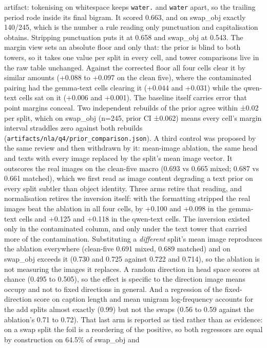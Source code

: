 \documentclass[
  11pt,
]{article}
\begin{document}
artifact: tokenising on whitespace keeps \texttt{water.} and
\texttt{water} apart, so the trailing period rode inside its final
bigram. It scored 0.663, and on swap\_obj exactly 140/245, which is the
number a rule reading only punctuation and capitalisation obtains.
Stripping punctuation puts it at 0.658 and swap\_obj at 0.543. The
margin view sets an absolute floor and only that: the prior is blind to
both towers, so it takes one value per split in every cell, and tower
comparisons live in the raw table unchanged. Against the corrected floor
all four cells clear it by similar amounts (+0.088 to +0.097 on the
clean five), where the contaminated pairing had the gemma-text cells
clearing it (+0.044 and +0.031) while the qwen-text cells sat on it
(+0.006 and +0.001). The baseline itself carries error that point
margins conceal. Two independent rebuilds of the prior agree within
±0.02 per split, which on swap\_obj (n=245, prior CI ±0.062) means every
cell's margin interval straddles zero against both rebuilds
(\texttt{artifacts/nla/q4/prior\_comparison.json}). A third control was
proposed by the same review and then withdrawn by it: mean-image
ablation, the same head and texts with every image replaced by the
split's mean image vector. It outscores the real images on the
clean-five macro (0.693 vs 0.665 mixed; 0.687 vs 0.661 matched), which
we first read as image content degrading a text prior on every split
subtler than object identity. Three arms retire that reading, and
normalisation retires the inversion itself: with the formatting stripped
the real images beat the ablation in all four cells, by +0.100 and
+0.098 in the gemma-text cells and +0.125 and +0.118 in the qwen-text
cells. The inversion existed only in the contaminated column, and only
under the text tower that carried more of the contamination.
Substituting a \emph{different} split's mean image reproduces the
ablation everywhere (clean-five 0.691 mixed, 0.689 matched) and on
swap\_obj exceeds it (0.730 and 0.725 against 0.722 and 0.714), so the
ablation is not measuring the images it replaces. A random direction in
head space scores at chance (0.495 to 0.505), so the effect is specific
to the direction image means occupy and not to fixed directions in
general. And a regression of the fixed-direction score on caption length
and mean unigram log-frequency accounts for the add splits almost
exactly (0.99) but not the swaps (0.56 to 0.59 against the ablation's
0.71 to 0.72). That last arm is reported as tied rather than as
evidence: on a swap split the foil is a reordering of the positive, so
both regressors are equal by construction on 64.5\% of swap\_obj and
\end{document}
